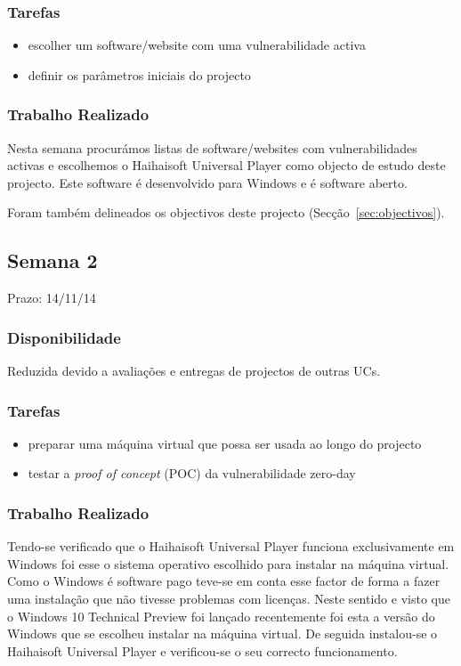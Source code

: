 \documentclass[a4paper]{article}
\begin{document}
\subsubsection{Tarefas}
\begin{itemize}
\item escolher um software/website com uma vulnerabilidade activa
\item definir os parâmetros iniciais do projecto
\end{itemize}

\subsubsection{Trabalho Realizado}
Nesta semana procurámos listas de software/websites com vulnerabilidades activas e escolhemos o Haihaisoft Universal Player como objecto de estudo deste projecto. Este software é desenvolvido para Windows e é software aberto.

Foram também delineados os objectivos deste projecto (Secção~\ref{sec:objectivos}).

\subsection{Semana 2}
Prazo: 14/11/14
\subsubsection{Disponibilidade}
Reduzida devido a avaliações e entregas de projectos de outras UCs.

\subsubsection{Tarefas}
\begin{itemize}
\item preparar uma máquina virtual que possa ser usada ao longo do projecto
\item testar a \textit{proof of concept} (POC) da vulnerabilidade zero-day
\end{itemize}

\subsubsection{Trabalho Realizado}
Tendo-se verificado que o Haihaisoft Universal Player funciona exclusivamente em Windows foi esse o sistema operativo escolhido para instalar na máquina virtual. Como o Windows é software pago teve-se em conta esse factor de forma a fazer uma instalação que não tivesse problemas com licenças. Neste sentido e visto que o Windows 10 Technical Preview foi lançado recentemente foi esta a versão do Windows que se escolheu instalar na máquina virtual. De seguida instalou-se o Haihaisoft Universal Player e verificou-se o seu correcto funcionamento.
\end{document}
